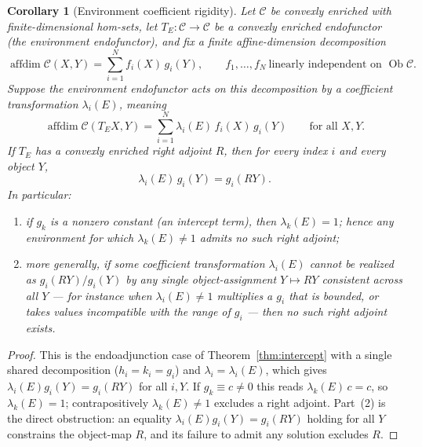 \documentclass[11pt]{article}
\newtheorem{corollary}[theorem]{Corollary}
\DeclareMathOperator{\affdim}{affdim}
\DeclareMathOperator{\Ob}{Ob}
\begin{document}
\begin{corollary}[Environment coefficient rigidity]
\label{cor:coefficient-rigidity}
Let $\mathcal C$ be convexly enriched with finite-dimensional hom-sets, let
$T_E:\mathcal C\to\mathcal C$ be a convexly enriched endofunctor (the
environment endofunctor), and fix a finite affine-dimension decomposition
\[
\affdim\mathcal C(X,Y)=\sum_{i=1}^N f_i(X)\,g_i(Y),
\qquad
f_1,\dots,f_N\ \text{linearly independent on }\Ob\mathcal C .
\]
Suppose the environment endofunctor acts on this decomposition by a
\emph{coefficient transformation} $\lambda_i(E)$, meaning
\[
\affdim\mathcal C(T_EX,Y)=\sum_{i=1}^N \lambda_i(E)\,f_i(X)\,g_i(Y)
\qquad\text{for all }X,Y .
\]
If $T_E$ has a convexly enriched right adjoint $R$, then for every index $i$ and
every object $Y$,
\[
\lambda_i(E)\,g_i(Y)=g_i(RY).
\]
In particular:
\begin{enumerate}
\item if $g_k$ is a nonzero constant (an intercept term), then
$\lambda_k(E)=1$; hence any environment for which $\lambda_k(E)\neq1$ admits no
such right adjoint;
\item more generally, if some coefficient transformation $\lambda_i(E)$ cannot
be realized as $g_i(RY)/g_i(Y)$ by any single object-assignment $Y\mapsto RY$
consistent across all $Y$ --- for instance when $\lambda_i(E)\neq1$ multiplies a
$g_i$ that is bounded, or takes values incompatible with the range of $g_i$ ---
then no such right adjoint exists.
\end{enumerate}
\end{corollary}

\begin{proof}
This is the endoadjunction case of Theorem~\ref{thm:intercept} with a single
shared decomposition ($h_i=k_i=g_i$) and $\lambda_i=\lambda_i(E)$, which gives
$\lambda_i(E)g_i(Y)=g_i(RY)$ for all $i,Y$. If $g_k\equiv c\neq0$ this reads
$\lambda_k(E)\,c=c$, so $\lambda_k(E)=1$; contrapositively $\lambda_k(E)\neq1$
excludes a right adjoint. Part~(2) is the direct obstruction: an equality
$\lambda_i(E)g_i(Y)=g_i(RY)$ holding for all $Y$ constrains the object-map $R$,
and its failure to admit any solution excludes $R$.
\end{proof}
\end{document}
